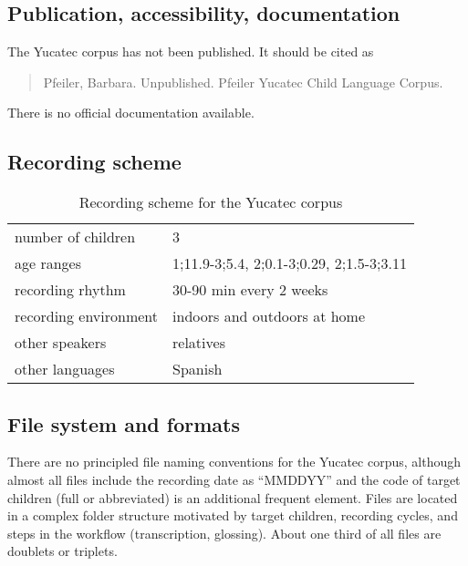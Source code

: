 \documentclass[a4paper, 11pt]{book}
\begin{document}
\subsection{Publication, accessibility, documentation}

The Yucatec corpus \citep{Pfeiler2015a} has not been published. It should be cited as 

\begin{quote}
	Pfeiler, Barbara. Unpublished. Pfeiler Yucatec Child Language Corpus.
\end{quote}

\noindent There is no official documentation available. 


\subsection{Recording scheme}

\begin{table}[ht]
	\centering
	\begin{tabular}{ll}
		\toprule
		number of children 	& 3 \\
		age ranges 			& 1;11.9-3;5.4, 2;0.1-3;0.29, 2;1.5-3;3.11 \\
		recording rhythm 	& 30-90 min every 2 weeks \\
		recording environment & indoors and outdoors at home \\
		other speakers 		& relatives \\
		other languages		& Spanish \\
		\bottomrule
	\end{tabular}
	\caption{Recording scheme for the Yucatec corpus}
	\label{tab:Yucatec recording scheme}
\end{table}


\subsection{File system and formats}
\label{subsec: Yucatec file system and formats}

There are no principled file naming conventions for the Yucatec corpus, although almost all files include the recording date as “MMDDYY” and the code of target children (full or abbreviated) is an additional frequent element. Files are located in a complex folder structure motivated by target children, recording cycles, and steps in the workflow (transcription, glossing). About one third of all files are doublets or triplets.
\end{document}
